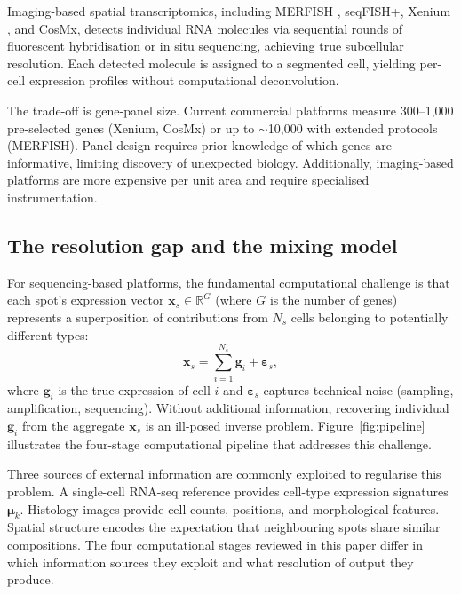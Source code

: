 Imaging-based spatial transcriptomics, including MERFISH \citep{chen2015spatially}, seqFISH+, Xenium \citep{janesick2023high}, and CosMx, detects individual RNA molecules via sequential rounds of fluorescent hybridisation or in situ sequencing, achieving true subcellular resolution. Each detected molecule is assigned to a segmented cell, yielding per-cell expression profiles without computational deconvolution.

The trade-off is gene-panel size. Current commercial platforms measure 300--1,000 pre-selected genes (Xenium, CosMx) or up to $\sim$10,000 with extended protocols (MERFISH). Panel design requires prior knowledge of which genes are informative, limiting discovery of unexpected biology. Additionally, imaging-based platforms are more expensive per unit area and require specialised instrumentation.

\subsection{The resolution gap and the mixing model}

For sequencing-based platforms, the fundamental computational challenge is that each spot's expression vector $\mathbf{x}_s \in \mathbb{R}^G$ (where $G$ is the number of genes) represents a superposition of contributions from $N_s$ cells belonging to potentially different types:
\begin{equation}
  \mathbf{x}_s = \sum_{i=1}^{N_s} \mathbf{g}_i + \boldsymbol{\varepsilon}_s,
  \label{eq:mixing}
\end{equation}
where $\mathbf{g}_i$ is the true expression of cell $i$ and $\boldsymbol{\varepsilon}_s$ captures technical noise (sampling, amplification, sequencing). Without additional information, recovering individual $\mathbf{g}_i$ from the aggregate $\mathbf{x}_s$ is an ill-posed inverse problem. Figure~\ref{fig:pipeline} illustrates the four-stage computational pipeline that addresses this challenge.

Three sources of external information are commonly exploited to regularise this problem. A single-cell RNA-seq reference provides cell-type expression signatures $\boldsymbol{\mu}_k$. Histology images provide cell counts, positions, and morphological features. Spatial structure encodes the expectation that neighbouring spots share similar compositions. The four computational stages reviewed in this paper differ in which information sources they exploit and what resolution of output they produce.

